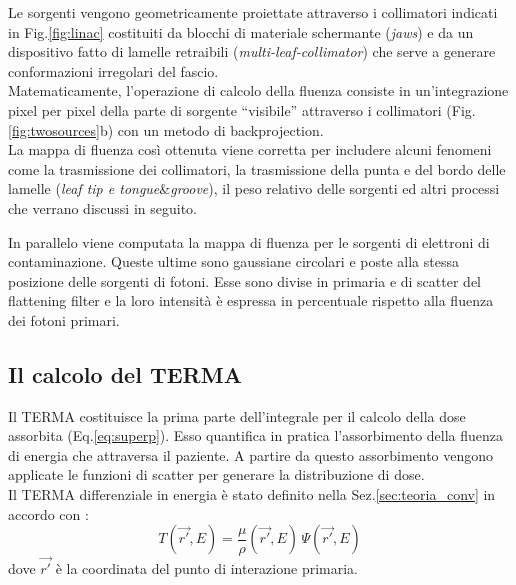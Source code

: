 {Le sorgenti vengono geometricamente proiettate attraverso i collimatori indicati in Fig.\ref{fig:linac} costituiti da blocchi di materiale schermante (\textit{jaws}) e da un dispositivo fatto di lamelle retraibili (\textit{multi-leaf-collimator}) che serve a generare conformazioni irregolari del fascio.\\
Matematicamente, l'operazione di calcolo della fluenza consiste in un'integrazione pixel per pixel della parte di sorgente \textquotedblleft visibile\textquotedblright{} attraverso i collimatori (Fig.\ref{fig:twosources}b) con un metodo di backprojection.\\
La mappa di fluenza così ottenuta viene corretta per includere alcuni fenomeni come la trasmissione dei collimatori, la trasmissione della punta e del bordo delle lamelle (\textit{leaf tip e tongue}\&\textit{groove}), il peso relativo delle sorgenti ed altri processi che verrano discussi in seguito.

In parallelo viene computata la mappa di fluenza per le sorgenti di elettroni di contaminazione. Queste ultime sono gaussiane circolari e poste alla stessa posizione delle sorgenti di fotoni. Esse sono divise in primaria e di scatter del flattening filter e la loro intensità è espressa in percentuale rispetto alla fluenza dei fotoni primari.

\subsection{Il calcolo del TERMA}
Il TERMA costituisce la prima parte dell'integrale per il calcolo della dose assorbita (Eq.\ref{eq:superp}). Esso quantifica in pratica l'assorbimento della fluenza di energia che attraversa il paziente. A partire da questo assorbimento vengono applicate le funzioni di scatter per generare la distribuzione di dose.\\
Il TERMA differenziale in energia è stato definito nella Sez.\ref{sec:teoria_conv} in accordo con \cite{Ahnesjo1999}:
\begin{equation}
\label{eq:termaE}
T(\vec{r'},E) = \frac{\mu}{\rho}(\vec{r'},E)\,\Psi(\vec{r'},E)
\end{equation}
dove $\vec{r'}$ è la coordinata del punto di interazione primaria.

}
